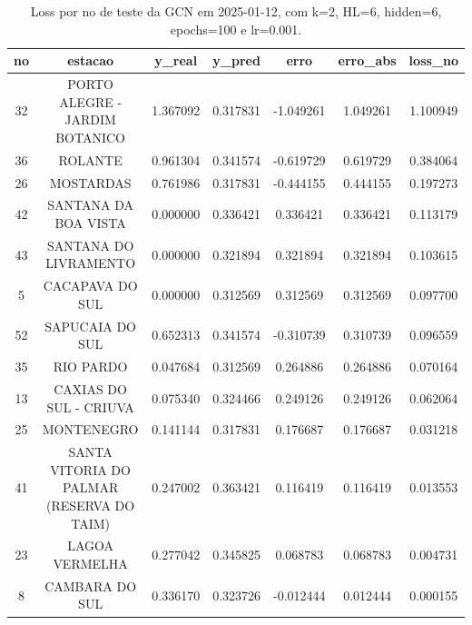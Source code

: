 \begin{table}[h]
\centering
\caption{Loss por no de teste da GCN em 2025-01-12, com k=2, HL=6, hidden=6, epochs=100 e lr=0.001.}
\label{tab:gcn_loss_k2_hl6_h6_e100_d20250112}
\begin{tabular}{ccccccc}
\toprule
no & estacao & y\_real & y\_pred & erro & erro\_abs & loss\_no \\
\midrule
32 & PORTO ALEGRE - JARDIM BOTANICO & 1.367092 & 0.317831 & -1.049261 & 1.049261 & 1.100949 \\
36 & ROLANTE & 0.961304 & 0.341574 & -0.619729 & 0.619729 & 0.384064 \\
26 & MOSTARDAS & 0.761986 & 0.317831 & -0.444155 & 0.444155 & 0.197273 \\
42 & SANTANA DA BOA VISTA & 0.000000 & 0.336421 & 0.336421 & 0.336421 & 0.113179 \\
43 & SANTANA DO LIVRAMENTO & 0.000000 & 0.321894 & 0.321894 & 0.321894 & 0.103615 \\
5 & CACAPAVA DO SUL & 0.000000 & 0.312569 & 0.312569 & 0.312569 & 0.097700 \\
52 & SAPUCAIA DO SUL & 0.652313 & 0.341574 & -0.310739 & 0.310739 & 0.096559 \\
35 & RIO PARDO & 0.047684 & 0.312569 & 0.264886 & 0.264886 & 0.070164 \\
13 & CAXIAS DO SUL - CRIUVA & 0.075340 & 0.324466 & 0.249126 & 0.249126 & 0.062064 \\
25 & MONTENEGRO & 0.141144 & 0.317831 & 0.176687 & 0.176687 & 0.031218 \\
41 & SANTA VITORIA DO PALMAR (RESERVA DO TAIM) & 0.247002 & 0.363421 & 0.116419 & 0.116419 & 0.013553 \\
23 & LAGOA VERMELHA & 0.277042 & 0.345825 & 0.068783 & 0.068783 & 0.004731 \\
8 & CAMBARA DO SUL & 0.336170 & 0.323726 & -0.012444 & 0.012444 & 0.000155 \\
\bottomrule
\end{tabular}
\end{table}
